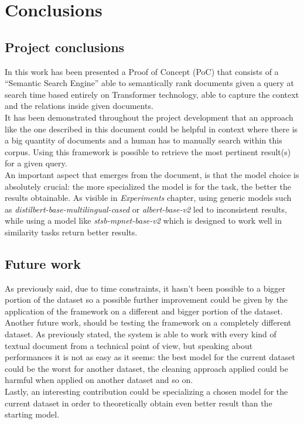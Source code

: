 \documentclass[\main/main.tex]{subfiles}
\begin{document}
\chapter{Conclusions}
\section{Project conclusions}
In this work has been presented a Proof of Concept (PoC) that consists of a ``Semantic Search Engine'' able to semantically rank documents given a query at search time based entirely on Transformer technology, able to capture the context and the relations inside given documents. \\
It has been demonstrated throughout the project development that an approach like the one described in this document could be helpful in context where there is a big quantity of documents and a human has to manually search within this corpus. Using this framework is possible to retrieve the most pertinent result(s) for a given query. \\
An important aspect that emerges from the document, is that the model choice is absolutely crucial: the more specialized the model is for the task, the better the results obtainable. As visible in \emph{Experiments} chapter, using generic models such as \emph{distilbert-base-multilingual-cased} or \emph{albert-base-v2} led to inconsistent results, while using a model like \emph{stsb-mpnet-base-v2} which is designed to work well in similarity tasks return better results.

\section{Future work}
As previously said, due to time constraints, it hasn't been possible to a bigger portion of the dataset so a possible further improvement could be given by the application of the framework on a different and bigger portion of the dataset. \\
Another future work, should be testing the framework on a completely different dataset. As previously stated, the system is able to work with every kind of textual document from a technical point of view, but speaking about performances it is not as easy as it seems: the best model for the current dataset could be the worst for another dataset, the cleaning approach applied could be harmful when applied on another dataset and so on.\\
Lastly, an interesting contribution could be specializing a chosen model for the current dataset in order to theoretically obtain even better result than the starting model.
\end{document}
